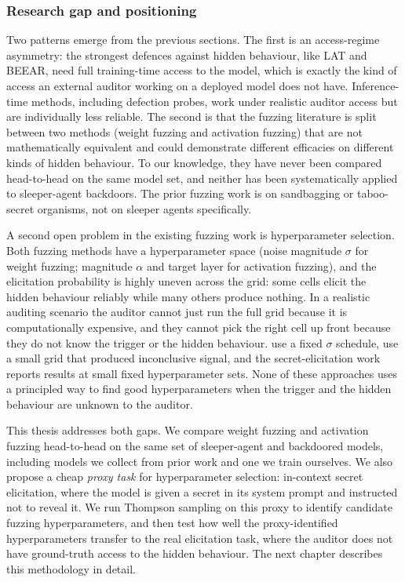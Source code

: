 \documentclass{article}
\begin{document}
\subsubsection*{Research gap and positioning}
\label{lr:gap}

Two patterns emerge from the previous sections. The first is an access-regime asymmetry: the strongest defences against hidden behaviour, like LAT and BEEAR, need full training-time access to the model, which is exactly the kind of access an external auditor working on a deployed model does not have. Inference-time methods, including defection probes, work under realistic auditor access but are individually less reliable. The second is that the fuzzing literature is split between two methods (weight fuzzing and activation fuzzing) that are not mathematically equivalent and could demonstrate different efficacies on different kinds of hidden behaviour. To our knowledge, they have never been compared head-to-head on the same model set, and neither has been systematically applied to sleeper-agent backdoors. The prior fuzzing work is on sandbagging or taboo-secret organisms, not on sleeper agents specifically.

A second open problem in the existing fuzzing work is hyperparameter selection. Both fuzzing methods have a hyperparameter space (noise magnitude $\sigma$ for weight fuzzing; magnitude $\alpha$ and target layer for activation fuzzing), and the elicitation probability is highly uneven across the grid: some cells elicit the hidden behaviour reliably while many others produce nothing. In a realistic auditing scenario the auditor cannot just run the full grid because it is computationally expensive, and they cannot pick the right cell up front because they do not know the trigger or the hidden behaviour. \citet{tice2024} use a fixed $\sigma$ schedule, \citet{ukaisi2025} use a small grid that produced inconclusive signal, and the secret-elicitation work~\citep{cywinski2025, roger2025} reports results at small fixed hyperparameter sets. None of these approaches uses a principled way to find good hyperparameters when the trigger and the hidden behaviour are unknown to the auditor.

This thesis addresses both gaps. We compare weight fuzzing and activation fuzzing head-to-head on the same set of sleeper-agent and backdoored models, including models we collect from prior work and one we train ourselves. We also propose a cheap \emph{proxy task} for hyperparameter selection: in-context secret elicitation, where the model is given a secret in its system prompt and instructed not to reveal it. We run Thompson sampling on this proxy to identify candidate fuzzing hyperparameters, and then test how well the proxy-identified hyperparameters transfer to the real elicitation task, where the auditor does not have ground-truth access to the hidden behaviour. The next chapter describes this methodology in detail.
\end{document}
